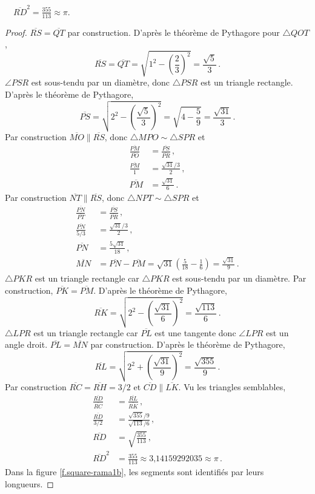 \begin{theorem}
$\quad\overline{RD}^2=\displaystyle\frac{355}{113}\approx \pi$.
\end{theorem}


\begin{proof}
$\overline{RS}=\overline{QT}$ par construction. D'après le théorème de Pythagore pour $\triangle QOT$,
\[
\overline{RS} =\overline{QT} =\sqrt{1^2-\left(\frac{2}{3}\right)^2}=\frac{\sqrt{5}}{3}\,.
\]
$\angle PSR$ est sous-tendu par un diamètre, donc $\triangle PSR$ est un triangle rectangle. D'après le théorème de Pythagore,
\[
\overline{PS} = \sqrt{2^2-\left(\frac{\sqrt{5}}{3}\right)^2}=\sqrt{4-\frac{5}{9}}=\frac{\sqrt{31}}{3}\,.
\]
Par construction $\overline{MO}\parallel \overline{RS}$, donc 
$\triangle MPO\sim \triangle SPR$ et 
%
\begin{align*}
\frac{\overline{PM}}{\overline{PO}}&=\frac{\overline{PS}}{\overline{PR}}\,,\\
\frac{\overline{PM}}{1}&=\frac{\sqrt{31}/3}{2}\,,\\
\overline{PM}&=\frac{\sqrt{31}}{6}\,.
\end{align*}
Par construction $\overline{NT}\parallel \overline{RS}$, donc  
$\triangle NPT\sim \triangle SPR$  et 
\begin{align*}
\frac{\overline{PN}}{\overline{PT}}&=\frac{\overline{PS}}{\overline{PR}}\,,\\
\frac{\overline{PN}}{5/3}&=\frac{\sqrt{31}/3}{2}\,,\\
\overline{PN}&=\frac{5\sqrt{31}}{18}\,,\\
\overline{MN}&=\overline{PN}-\overline{PM}=\sqrt{31}\left(\frac{5}{18}-\frac{1}{6}\right) = \frac{\sqrt{31}}{9}\,.
\end{align*}
$\triangle PKR$ est un triangle rectangle car $\triangle PKR$ est sous-tendu par un diamètre. Par construction,  $\overline{PK}=\overline{PM}$. D'après le théorème de Pythagore,
\[
\overline{RK}=\sqrt{2^2-\left(\frac{\sqrt{31}}{6}\right)^2} = \frac{\sqrt{113}}{6}\,.
\]
$\triangle LPR$ est un triangle rectangle car  $\overline{PL}$ est une tangente donc $\angle LPR$ est un angle droit. $\overline{PL} = \overline{MN}$ par construction. D'après le théorème de Pythagore,
\[
\overline{RL}=\sqrt{2^2+\left(\frac{\sqrt{31}}{9}\right)^2} = \frac{\sqrt{355}}{9}\,.
\]
Par construction
$\overline{RC}=\overline{RH}=3/2$ et $\overline{CD} \parallel \overline{LK}$. Vu les triangles semblables,
%
\begin{align*}
\frac{\overline{RD}}{\overline{RC}}&=\frac{\overline{RL}}{\overline{RK}}\,,\\
\frac{\overline{RD}}{3/2}&=\frac{\sqrt{355}/9}{\sqrt{113}/6}\,,\\
\overline{RD}&=\sqrt{\frac{355}{113}}\,,\\
\overline{RD}^2&=\frac{355}{113}\approx \mbox{3,14159292035}\approx \pi\,.
\end{align*}
Dans la figure \ref{f.square-rama1b}, les segments sont identifiés par leurs longueurs.
\end{proof}

